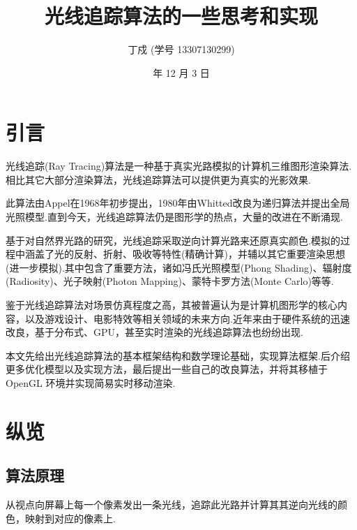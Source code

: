 \documentclass[10pt,twocolumn]{article}
\begin{document}
\title{\hei 光线追踪算法的一些思考和实现}
\author{\fs 丁戍 \small{\fs (学号 13307130299)}}
\date{\small {} 年 12 月 3 日}

\section{\hei 引言}
光线追踪(Ray Tracing)算法是一种基于真实光路模拟的计算机三维图形渲染算法.相比其它大部分渲染算法，光线追踪算法可以提供更为真实的光影效果.

此算法由Appel在1968年初步提出，1980年由Whitted改良为递归算法并提出全局光照模型.直到今天，光线追踪算法仍是图形学的热点，大量的改进在不断涌现.

基于对自然界光路的研究，光线追踪采取逆向计算光路来还原真实颜色.模拟的过程中涵盖了光的反射、折射、吸收等特性(精确计算)，并辅以其它重要渲染思想(进一步模拟).其中包含了重要方法，诸如冯氏光照模型(Phong Shading)、辐射度(Radiosity)、光子映射(Photon Mapping)、蒙特卡罗方法(Monte Carlo)等等.

鉴于光线追踪算法对场景仿真程度之高，其被普遍认为是计算机图形学的核心内容，以及游戏设计、电影特效等相关领域的未来方向.近年来由于硬件系统的迅速改良，基于分布式、GPU，甚至实时渲染的光线追踪算法也纷纷出现.

本文先给出光线追踪算法的基本框架结构和数学理论基础，实现算法框架.后介绍更多优化模型以及实现方法，最后提出一些自己的改良算法，并将其移植于 OpenGL 环境并实现简易实时移动渲染.

\section{\hei 纵览}
\subsection{\hei 算法原理}
从视点向屏幕上每一个像素发出一条光线，追踪此光路并计算其其逆向光线的颜色，映射到对应的像素上.
\end{document}
